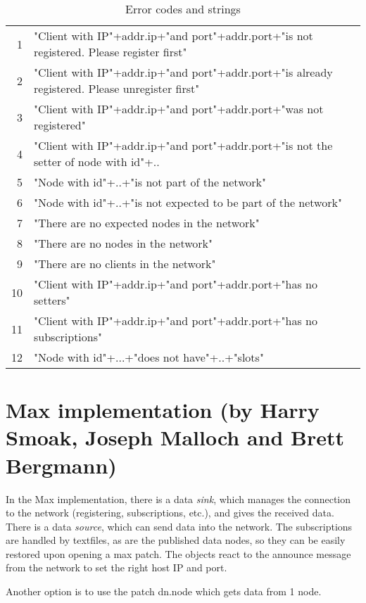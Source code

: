 \documentclass[letterpaper,10pt]{article}
\begin{document}
\begin{table}
\small
\begin{center}
\begin{tabular}{|rl|}
 \hline
  1 & "Client with IP"+addr.ip+"and port"+addr.port+"is not registered. Please register first" \\
  2 & "Client with IP"+addr.ip+"and port"+addr.port+"is already registered. Please unregister first" \\
  3 & "Client with IP"+addr.ip+"and port"+addr.port+"was not registered"  \\
  4 & "Client with IP"+addr.ip+"and port"+addr.port+"is not the setter of node with id"+..  \\
  5 & "Node with id"+..+"is not part of the network" \\
  6 & "Node with id"+..+"is not expected to be part of the network"  \\
  7 & "There are no expected nodes in the network" \\
  8 & "There are no nodes in the network"  \\
  9 & "There are no clients in the network"  \\
 10 & "Client with IP"+addr.ip+"and port"+addr.port+"has no setters"  \\
 11 & "Client with IP"+addr.ip+"and port"+addr.port+"has no subscriptions" \\
 12 & "Node with id"+...+"does not have"+..+"slots" \\
 \hline
 \end{tabular}
\end{center}
\caption{Error codes and strings}
\label{errorcodes}
\end{table}


\section{Max implementation (by Harry Smoak, Joseph Malloch and Brett Bergmann)}
In the Max implementation, there is a data \textit{sink}, which manages the connection to the network (registering, subscriptions, etc.), and gives the received data. There is a data \textit{source}, which can send data into the network. The subscriptions are handled by textfiles, as are the published data nodes, so they can be easily restored upon opening a max patch.
The objects react to the announce message from the network to set the right host IP and port.

Another option is to use the patch dn.node which gets data from 1 node.
\end{document}

